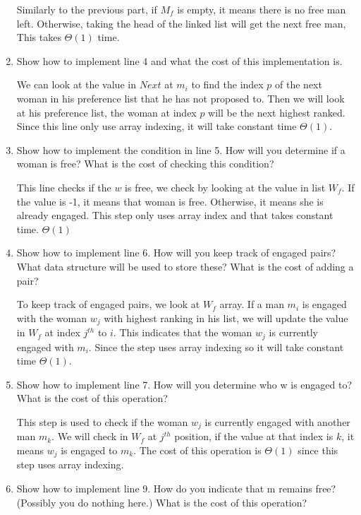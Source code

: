 \documentclass{cpsc413Solutions}
\begin{document}
\begin{problemlist}
\begin{problem}
\begin{answer}
\begin{enumerate}
    Similarly to the previous part, if $M_f$ is empty, it means there is no free man left. Otherwise, taking the head of the linked list will get the next free man, This takes $\Theta(1)$ time.
    
    \item Show how to implement line 4 and what the cost of this implementation is.
    
    We can look at the value in $Next$ at $m_i$ to find the index $p$ of the next woman in his preference list that he has not proposed to. Then we will look at his preference list, the woman at index $p$ will be the next highest ranked. Since this line only use array indexing, it will take constant time $\Theta(1)$.
    
    \item Show how to implement the condition in line 5. How will you determine if a woman is free? What is the cost of checking this condition? 
    
    This line checks if the $w$ is free, we check by looking at the value in list $W_f$. If the value is -1, it means that woman is free. Otherwise, it means she is already engaged. This step only uses array index and that takes constant time. $\Theta(1)$
    
    \item Show how to implement line 6. How will you keep track of engaged pairs? What data structure will be used to store these? What is the cost of adding a pair?
    
    To keep track of engaged pairs, we look at $W_f$ array. If a man $m_i$ is engaged with the woman $w_j$ with highest ranking in his list, we will update the value in $W_f$ at index $j^{th}$ to $i$. This indicates that the woman $w_j$ is currently engaged with $m_i$. Since the step uses array indexing so it will take constant time $\Theta(1)$.
    
    \item Show how to implement line 7. How will you determine who w is engaged to? What is the cost of this operation? 
    
    This step is used to check if the woman $w_j$ is currently engaged with another man $m_k$. We will check in $W_f$ at $j^{th}$ position, if the value at that index is $k$, it means $w_j$ is engaged to $m_k$. The cost of this operation is $\Theta(1)$ since this step uses array indexing.
    
    \item Show how to implement line 9. How do you indicate that m remains free? (Possibly you do nothing here.) What is the cost of this operation?
    

\end{enumerate}
\end{answer}
\end{problem}
\end{problemlist}
\end{document}
